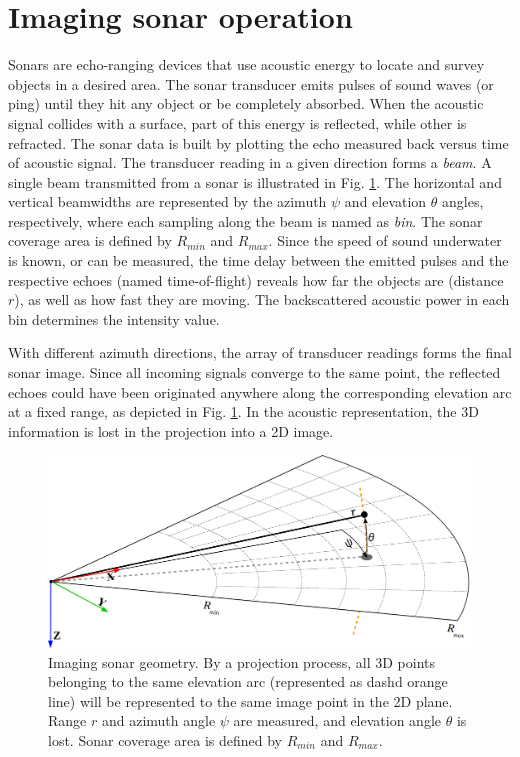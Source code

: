 \documentclass[final,5p,times]{elsarticle}
\begin{document}

\section{Imaging sonar operation}
\label{sonar:operation}

Sonars are echo-ranging devices that use acoustic energy to locate and survey
objects in a desired area. The sonar transducer emits pulses of sound waves
(or ping) until they hit any object or be completely absorbed. When the
acoustic signal collides with a surface, part of this energy is reflected,
while other is refracted. The sonar data is built by plotting the echo measured back versus time of acoustic signal. The transducer reading in a given direction forms a \textit{beam}. A single beam transmitted from a sonar is illustrated in Fig. \ref{fig:sonar_geometry}. The horizontal and vertical beamwidths are represented by the azimuth $\psi$ and elevation $\theta$ angles, respectively, where each sampling along the beam is named as \textit{bin}. The sonar coverage area is defined by $R_{min}$ and $R_{max}$. Since the speed of sound underwater is known, or can be measured, the time delay between the emitted pulses and the respective echoes (named time-of-flight) reveals how far the objects are (distance $r$), as well as how fast they are moving. The backscattered acoustic power in each bin determines the intensity value.

With different azimuth directions, the array of transducer readings forms the
final sonar image. Since all incoming signals converge to the same point, the
reflected echoes could have been originated anywhere along the corresponding
elevation arc at a fixed range, as depicted in Fig. \ref{fig:sonar_geometry}.
In the acoustic representation, the 3D information is lost in the projection
into a 2D image.

\begin{figure}[t]
    \includegraphics[width=\columnwidth]{figs/sonar_geometry_2}
    \captionsetup{justification=justified}
    \caption{Imaging sonar geometry. By a projection process, all 3D points  belonging to the same elevation arc (represented as dashd orange line) will be represented to the same image point in the 2D plane. Range $r$ and azimuth angle $\psi$ are measured, and elevation angle $\theta$ is lost. Sonar coverage area is defined by $R_{min}$ and $R_{max}$.}
    \label{fig:sonar_geometry}
\end{figure}
\end{document}
